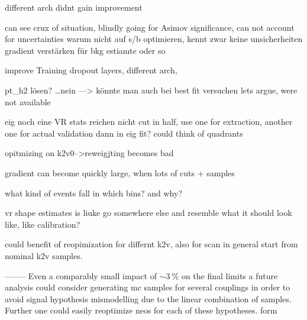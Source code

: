 different arch didnt gain improvement


can see crux of situation, blindly going for Asimov significance, can not account for uncertainties
warum nicht auf s/b optimieren, kennt zwar keine unsicherheiten
gradient verstärken für bkg estiamte oder so


improve Training
dropout layers, different arch, 


pt_h2 lösen? …nein —> könnte man auch bei best fit versuchen
lets argue, were not available

eig noch eine VR
stats reichen nicht 
cut in half, use one for extraction, another one for actual validation dann in eig fit?
could think of quadrants

opitmizing on k2v0-->reweigjting becomes bad

gradient can become quickly large, when lots of cuts + samples

what kind of events fall in which bins? and why?

vr shape estimates is liuke go somewhere else and resemble what it should look like, like calibration?

could benefit of reopimization for differnt k2v, also for scan in general start from nominal k2v samples.






--------
Even a comparably small impact of $\sim\qty[]{3}{\percent}$ on the final limits a future analysis could consider generating \ac{mc} samples for several \ktwov couplings in order to avoid signal hypothesis mismodelling due to the linear combination of samples. Further one could easily reoptimize neos for each of these hypotheses. form
